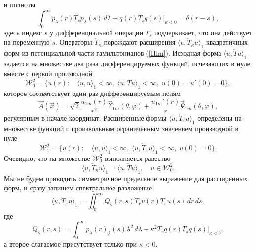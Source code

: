 \documentclass[12pt]{article}
\newcommand{\WW}{\mathscr{W}}
\begin{document}
    и полноты
\begin{equation*}
    \int_{0}^{\infty} p_{\lambda}(r) T_{s} p_{\lambda}(s) \,d\lambda
        + q(r) T_{s} q(s)\bigr|_{\kappa < 0} = \delta(r-s) ,
\end{equation*}
    здесь индекс
$ s $
    у дифференциальной операции
$ T_{s} $
    подчеркивает, что она действует на переменную
$ s $.
    Операторы
$ \check{T}_{\kappa} $
    порождают расширения
$ \langle u, \check{T}_{\kappa} u\rangle_{1} $
    квадратичных форм из потенциальной части гамильтонианов
(\ref{Hlm}).
    Исходная форма
$ \langle u, \check{T} u\rangle_{1} $
    задается на множестве два раза дифференцируемых функций, исчезающих
    в нуле вместе с первой производной
\begin{equation*}
    \WW^{2}_{0} = \{u(r):\quad \langle u,u\rangle_{1} <\infty, \;
	\langle u, \check{T}u\rangle_{1} < \infty, \; u(0)=u'(0) =0 \} ,
\end{equation*}
    которое соответствует один раз дифференцируемым полям
\begin{equation}
\label{Atrns}
    \vec{A}(\vec{x}) =
        \sqrt{2}
	    \frac{u_{1m}(r)}{r^{2}} \vec{\Upsilon}_{1m}(\theta,\varphi) +
        \frac{u_{1m}'(r)}{r} \vec{\Psi}_{1m}(\theta,\varphi) ,
\end{equation}
    регулярным в начале координат.
    Расширенные формы
$ \langle u, \check{T}_{\kappa} u\rangle_{1} $
    определены на множестве функций с произвольным ограниченным значением
    производной в нуле
\begin{equation*}
    \WW^{2}_{1} = \{u(r):\quad \langle u,u\rangle_{1} <\infty, \;
	\langle u, \check{T}_{\kappa}u\rangle_{1} < \infty, \; u(0)=0 \} .
\end{equation*}
    Очевидно, что на множестве
$ \WW^{2}_{0} $
    выполняется равество
\begin{equation*}
    \langle u, \check{T}_{\kappa} u\rangle_{1}= \langle u,
	\check{T} u\rangle_{1} ,\quad u \in \WW^{2}_{0} .
\end{equation*}
    Мы не будем приводить симметричное предельное выражение для расширенных
    форм, и сразу запишем спектральное разложение
\begin{equation*}
    \langle u, \check{T}_{\kappa} u\rangle_{1}
    = \iint_{0}^{\infty} Q_{\kappa}(r,s) T_{r}u(r) T_{s}u(s) \,dr\,ds ,
\end{equation*}
    где
\begin{equation*}
    Q_{\kappa}(r,s) = \int_{0}^{\infty} p_{\lambda}(r)
    	_{\lambda}(s) \lambda^{2} \,d\lambda
        - \kappa^{2} T_{r} q(r) T_{s} q(s) \bigr|_{\kappa <0} ,
\end{equation*}
    а второе слагаемое присутствует только при
$ \kappa < 0 $.
\end{document}
